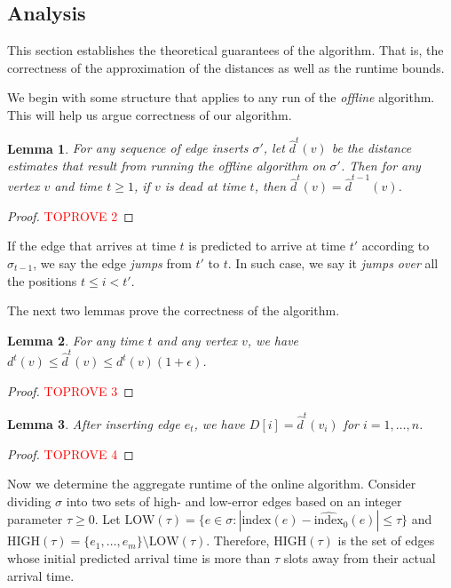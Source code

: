 \documentclass[11pt]{article}
\newtheorem{lemma}{Lemma}
\newcommand{\pred}{\hat{\sigma}}
\newcommand{\ind}{\text{index}}
\begin{document}
\subsection{Analysis}

This section establishes the theoretical guarantees of the algorithm. That is, the correctness of the approximation of the distances as well as the runtime bounds. 

We begin with some structure that applies to any run of the \emph{offline} algorithm.  This will help us argue correctness of our algorithm.
\begin{lemma}
\label{lem:dead_estimates_dont_change}
    For any sequence of edge inserts $\sigma'$, let $\hat{d}^t(v)$ be the distance estimates that result from running the offline algorithm on $\sigma'$.  Then 
    for any vertex $v$ and time $t \geq 1$, 
    if $v$ is dead at time $t$, then $\hat{d}^t(v) = \hat{d}^{t-1}(v)$.
\end{lemma}
\begin{proof}\textcolor{red}{TOPROVE 2}\end{proof}
   
If the edge that arrives at time $t$ is predicted to arrive at time $t'$ according to $\pred_{t-1}$, we say the edge \emph{jumps} from $t'$ to $t$. In such case, we say it \emph{jumps over} all the positions $t \leq i < t'$. 

The next two lemmas prove the correctness of the algorithm. 

\begin{lemma}\label{lem:pred_approx}
    For any time $t$ and any vertex $v$, we have $d^t(v) \leq \hat{d}^t(v) \leq d^t(v)(1+\epsilon)$.
\end{lemma}

\begin{proof}\textcolor{red}{TOPROVE 3}\end{proof}

\begin{lemma}
\label{lem:D}
    After inserting edge $e_t$, we have $D[i] = \hat{d}^t(v_i)$ for $i=1,\ldots,n$.
\end{lemma}

\begin{proof}\textcolor{red}{TOPROVE 4}\end{proof}

Now we determine the aggregate runtime of the online algorithm. Consider dividing $\sigma$ into two sets of high- and low-error edges based on an integer parameter $\tau \geq 0$.  Let $\text{LOW}(\tau) = \{e \in \sigma : |\ind(e) - \widehat{\ind}_0(e)| \leq \tau\}$ and $\text{HIGH}(\tau) =  \{e_1, \ldots, e_m\} \setminus \text{LOW}(\tau)$. 
Therefore, $\text{HIGH}(\tau)$ is the set of edges whose initial predicted arrival time is more than $\tau$ slots away from their actual arrival time.
\end{document}
